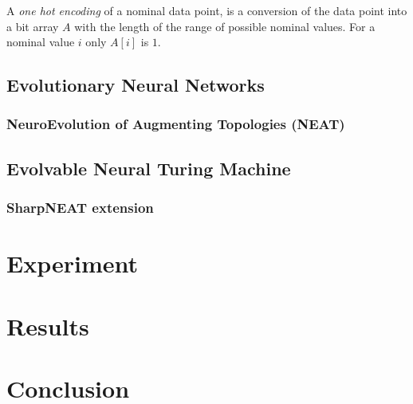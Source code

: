 \documentclass{article}
\begin{document}
A \textit{one hot encoding} of a nominal data point, is a conversion of the data point into a bit array $ A $ with the length of the range of possible nominal values. For a nominal value $ i $ only $ A[i] $ is $ 1 $.  

\subsection{Evolutionary Neural Networks}
\subsubsection{NeuroEvolution of Augmenting Topologies (NEAT)}
\subsection{Evolvable Neural Turing Machine}
\subsubsection{SharpNEAT extension}

\section{Experiment}
\section{Results}
\section{Conclusion}
\end{document}
